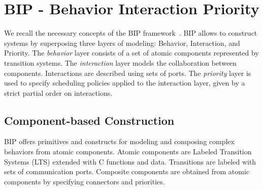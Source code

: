 \section{BIP - Behavior Interaction Priority}
\label{sec:bip}
%
We recall the necessary concepts of the BIP framework~\cite{bip11}.
BIP allows to construct systems by superposing three layers of modeling: Behavior, Interaction, and Priority.
The \emph{behavior} layer consists of a set of atomic components represented by transition systems. The \emph{interaction} layer models the collaboration between components. Interactions are described using sets of ports. The \emph{priority} layer is used to specify scheduling policies applied to the interaction layer, given by a strict partial order on interactions.
%
\subsection{Component-based Construction}
%
BIP offers primitives and constructs for modeling and composing complex behaviors from atomic components. Atomic components are Labeled Transition Systems (LTS) extended with C functions and data. Transitions are labeled with sets of communication ports. Composite components are obtained from atomic components by specifying connectors and priorities.
%
%
